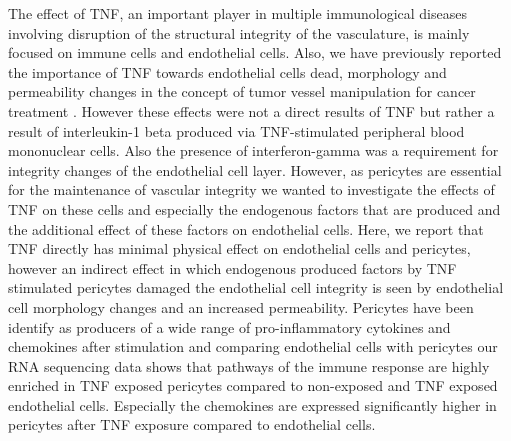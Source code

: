 The effect of TNF, an important player in multiple immunological diseases involving disruption of the structural integrity of the vasculature, is mainly focused on immune cells and endothelial cells. Also, we have previously reported the importance of TNF towards endothelial cells dead, morphology and permeability changes in the concept of tumor vessel manipulation for cancer treatment \cite{Seynhaeve_2007,hoving2005addition}. However these effects were not a direct results of TNF but rather a result of interleukin-1 beta produced via TNF-stimulated peripheral blood mononuclear cells\cite{Seynhaeve_2006}. Also the presence of interferon-gamma was a requirement for integrity changes of the endothelial cell layer\cite{Seynhaeve_2006,R_egg_1998}. However, as pericytes are essential for the maintenance of vascular integrity we wanted to investigate the effects of TNF on these cells and especially the endogenous factors that are produced and the additional effect of these factors on endothelial cells. Here, we report that TNF directly has minimal physical effect on endothelial cells and pericytes, however an indirect effect in which endogenous produced factors by TNF stimulated pericytes damaged the endothelial cell integrity is seen by endothelial cell morphology changes and an increased permeability. Pericytes have been identify as producers of a wide range of pro-inflammatory cytokines and chemokines after stimulation\cite{Kaushik_2021,Guijarro_Mu_oz_2014} and comparing endothelial cells with pericytes our RNA sequencing data shows that pathways of the immune response are highly enriched in TNF exposed pericytes compared to non-exposed and TNF exposed endothelial cells. Especially the chemokines are expressed significantly higher in pericytes after TNF exposure compared to endothelial cells.

